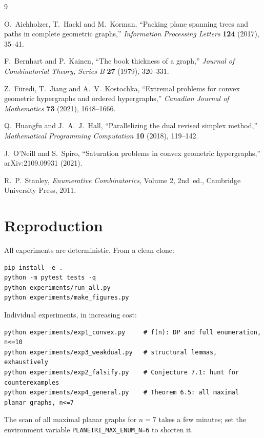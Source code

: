 \documentclass[11pt]{article}
\theoremstyle{plain}
\theoremstyle{definition}
\theoremstyle{remark}
\begin{document}
\begin{thebibliography}{9}

O.~Aichholzer, T.~Hackl and M.~Korman, ``Packing plane spanning trees and paths in
complete geometric graphs,'' \textit{Information Processing Letters} \textbf{124} (2017),
35--41.

F.~Bernhart and P.~Kainen, ``The book thickness of a graph,'' \textit{Journal of
Combinatorial Theory, Series B} \textbf{27} (1979), 320--331.

Z.~F\"uredi, T.~Jiang and A.~V.~Kostochka, ``Extremal problems for convex geometric
hypergraphs and ordered hypergraphs,'' \textit{Canadian Journal of Mathematics}
\textbf{73} (2021), 1648--1666.

Q.~Huangfu and J.~A.~J.~Hall, ``Parallelizing the dual revised simplex method,''
\textit{Mathematical Programming Computation} \textbf{10} (2018), 119--142.

J.~O'Neill and S.~Spiro, ``Saturation problems in convex geometric hypergraphs,''
arXiv:2109.09931 (2021).

R.~P.~Stanley, \emph{Enumerative Combinatorics}, Volume 2, 2nd~ed., Cambridge University
Press, 2011.

\end{thebibliography}

\appendix

\section{Reproduction}

All experiments are deterministic.  From a clean clone:
\begin{verbatim}
pip install -e .
python -m pytest tests -q
python experiments/run_all.py
python experiments/make_figures.py
\end{verbatim}
Individual experiments, in increasing cost:
\begin{verbatim}
python experiments/exp1_convex.py     # f(n): DP and full enumeration, n<=10
python experiments/exp3_weakdual.py   # structural lemmas, exhaustively
python experiments/exp2_falsify.py    # Conjecture 7.1: hunt for counterexamples
python experiments/exp4_general.py    # Theorem 6.5: all maximal planar graphs, n<=7
\end{verbatim}
The scan of all maximal planar graphs for $n=7$ takes a few minutes; set the environment
variable \texttt{PLANETRI\_MAX\_ENUM\_N=6} to shorten it.
\end{document}
